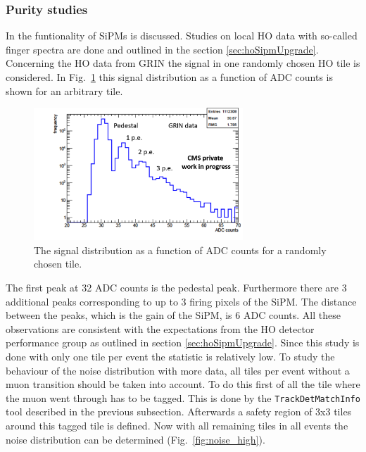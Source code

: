 		\subsubsection{Purity studies}
			In \cite{dn2014-020} the funtionality of SiPMs is discussed.
			Studies on local HO data with so-called finger spectra are done and outlined in the section \ref{sec:hoSipmUpgrade}.
			Concerning the HO data from GRIN the signal in one randomly chosen HO tile is considered.
			In Fig.\ \ref{fig:noise_low} this signal distribution as a function of ADC counts is shown for an arbitrary tile.
			\begin{figure}[htbp]
				\centering
				\includegraphics[width=0.70\textwidth]{Figures/erdogan/noise_low.png}
				\caption{The signal distribution as a function of ADC counts for a randomly chosen tile.}
				\label{fig:noise_low}
			\end{figure}
			The first peak at 32 ADC counts is the pedestal peak.
			Furthermore there are 3 additional peaks corresponding to up to 3 firing pixels of the SiPM.
			The distance between the peaks, which is the gain of the SiPM, is 6 ADC counts.
			All these observations are consistent with the expectations from the HO detector performance group as outlined in section \ref{sec:hoSipmUpgrade}.
			Since this study is done with only one tile per event the statistic is relatively low.
			To study the behaviour of the noise distribution with more data, all tiles per event without a muon transition should be taken into account.
			To do this first of all the tile where the muon went through has to be tagged.
			This is done by the \verb+TrackDetMatchInfo+ tool described in the previous subsection.
			Afterwards a safety region of 3x3 tiles around this tagged tile is defined.
			Now with all remaining tiles in all events the noise distribution can be determined (Fig.\ \ref{fig:noise_high}).
